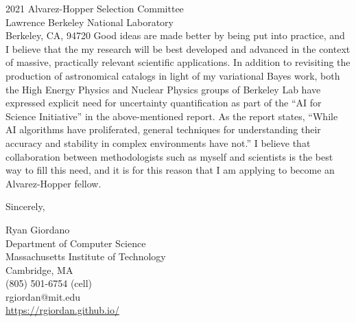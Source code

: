 \documentclass{letter}
\begin{document}
\begin{letter}{2021 Alvarez-Hopper Selection Committee\\
Lawrence Berkeley National Laboratory\\
Berkeley, CA, 94720}
Good ideas are made better by being put into practice, and I believe that the my
research will be best developed and advanced in the context of massive,
practically relevant scientific applications.  In addition to revisiting the
production of astronomical catalogs in light of my variational Bayes work, both
the High Energy Physics and Nuclear Physics groups of Berkeley Lab have
expressed explicit need for uncertainty quantification as part of the ``AI for
Science Initiative'' in the above-mentioned report.  As the report states,
``While  AI algorithms have proliferated,  general  techniques  for
understanding  their accuracy  and stability in complex environments have not.''
I believe that collaboration between methodologists such as myself and
scientists is the best way to fill this need, and it is for this reason
that I am applying to become an Alvarez-Hopper fellow.


\closing{Sincerely,}

Ryan Giordano\\
Department of Computer Science\\
Massachusetts Institute of Technology\\
Cambridge, MA\\
(805) 501-6754 (cell)\\
rgiordan@mit.edu\\
\url{https://rgiordan.github.io/}
\end{letter}

% 
% 
\end{document}
